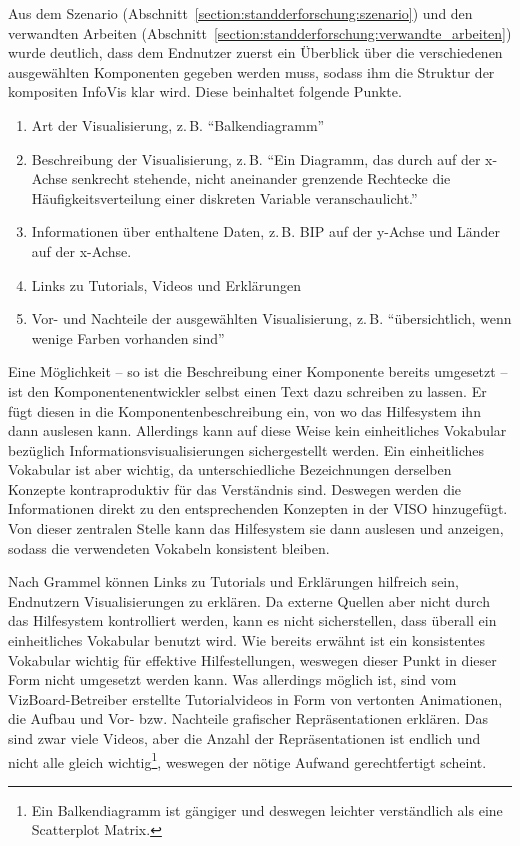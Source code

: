 \documentclass[
	headsepline,
	footsepline,
	fontsize=12pt,
	bibliography=totoc
]{scrbook}
\begin{document}
Aus dem Szenario (Abschnitt~\ref{section:standderforschung:szenario}) und den verwandten Arbeiten (Abschnitt~\ref{section:standderforschung:verwandte_arbeiten}) wurde deutlich, dass dem Endnutzer zuerst ein Überblick über die verschiedenen ausgewählten Komponenten gegeben werden muss, sodass ihm die Struktur der kompositen InfoVis klar wird. Diese beinhaltet folgende Punkte.


\begin{enumerate}
	\item Art der Visualisierung, z.\,B. \enquote{Balkendiagramm}
	\item Beschreibung der Visualisierung, z.\,B. \enquote{Ein Diagramm, das durch auf der x-Achse senkrecht stehende, nicht aneinander grenzende Rechtecke die Häufigkeitsverteilung einer diskreten Variable veranschaulicht.}
	\item Informationen über enthaltene Daten, z.\,B. BIP auf der y-Achse und Länder auf der x-Achse.
	\item Links zu Tutorials, Videos und Erklärungen
	\item Vor- und Nachteile der ausgewählten Visualisierung, z.\,B. \enquote{übersichtlich, wenn wenige Farben vorhanden sind}
\end{enumerate}

Eine Möglichkeit -- so ist die Beschreibung einer Komponente bereits umgesetzt -- ist den Komponentenentwickler selbst einen Text dazu schreiben zu lassen. Er fügt diesen in die Komponentenbeschreibung ein, von wo das Hilfesystem ihn dann auslesen kann. Allerdings kann auf diese Weise kein einheitliches Vokabular bezüglich Informationsvisualisierungen sichergestellt werden. Ein einheitliches Vokabular ist aber wichtig, da unterschiedliche Bezeichnungen derselben Konzepte kontraproduktiv für das Verständnis sind. Deswegen werden die Informationen direkt zu den entsprechenden Konzepten in der VISO hinzugefügt. Von dieser zentralen Stelle kann das Hilfesystem sie dann auslesen und anzeigen, sodass die verwendeten Vokabeln konsistent bleiben.


Nach Grammel \cite{Grammel2012} können Links zu Tutorials und Erklärungen hilfreich sein, Endnutzern Visualisierungen zu erklären. Da externe Quellen aber nicht durch das Hilfesystem kontrolliert werden, kann es nicht sicherstellen, dass überall ein einheitliches Vokabular benutzt wird. Wie bereits erwähnt ist ein konsistentes Vokabular wichtig für effektive Hilfestellungen, weswegen dieser Punkt in dieser Form nicht umgesetzt werden kann. Was allerdings möglich ist, sind vom VizBoard-Betreiber erstellte Tutorialvideos in Form von vertonten Animationen, die Aufbau und Vor- bzw. Nachteile grafischer Repräsentationen erklären. Das sind zwar viele Videos, aber die Anzahl der Repräsentationen ist endlich und nicht alle gleich wichtig\footnote{Ein Balkendiagramm ist gängiger und deswegen leichter verständlich als eine Scatterplot Matrix.}, weswegen der nötige Aufwand gerechtfertigt scheint.
\end{document}
